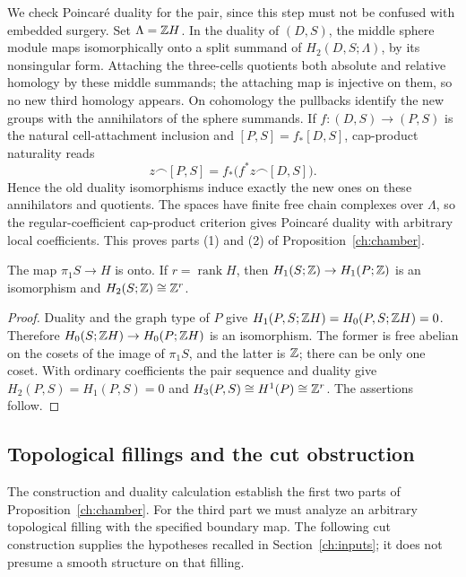 We check Poincar\'e duality for the pair, since this step must not be
confused with embedded surgery.  Set $\Lambda=\mathbb Z H$.  In the duality
of $(D,S)$, the middle sphere module maps isomorphically onto a split
summand of $H_2(D,S;\Lambda)$, by its nonsingular form.  Attaching the
three-cells quotients both absolute and relative homology by these
middle summands; the attaching map is injective on them, so no new
third homology appears.  On cohomology the pullbacks identify the new
groups with the annihilators of the sphere summands.  If
$f:(D,S)\to(P,S)$ is the natural cell-attachment inclusion and
$[P,S]=f_*[D,S]$, cap-product naturality reads
\[
 z\frown[P,S]=f_*\bigl(f^*z\frown[D,S]\bigr).
\]
Hence the old duality isomorphisms induce exactly the new ones on
these annihilators and quotients.  The spaces have finite free chain
complexes over $\Lambda$, so the regular-coefficient cap-product
criterion gives Poincar\'e duality with arbitrary local coefficients.
This proves parts (1) and (2) of Proposition~\ref{ch:chamber}.

\begin{corollary}
\label{ch:boundary-homology}
The map $\pi_1S\to H$ is onto.  If $r=\operatorname{rank}H$, then
$H_1(S;\mathbb Z)\to H_1(P;\mathbb Z)$ is an isomorphism and
$H_2(S;\mathbb Z)\cong\mathbb Z^r$.
\end{corollary}

\begin{proof}
Duality and the graph type of $P$ give
$H_1(P,S;\mathbb Z H)=H_0(P,S;\mathbb Z H)=0$.  Therefore
$H_0(S;\mathbb Z H)\to H_0(P;\mathbb Z H)$ is an isomorphism.
The former is free abelian on the cosets of the image of $\pi_1S$,
and the latter is $\mathbb Z$; there can be only one coset.
With ordinary coefficients the pair sequence and duality give
$H_2(P,S)=H_1(P,S)=0$ and
$H_3(P,S)\cong H^1(P)\cong\mathbb Z^r$.  The assertions follow.
\end{proof}

\subsection{Topological fillings and the cut obstruction}
\label{ch:forbidden-filling}

The construction and duality calculation establish the first two parts
of Proposition~\ref{ch:chamber}. For the third part we must analyze an
arbitrary topological filling with the specified boundary map. The
following cut construction supplies the hypotheses recalled in
Section~\ref{ch:inputs}; it does not presume a smooth structure on that
filling.

